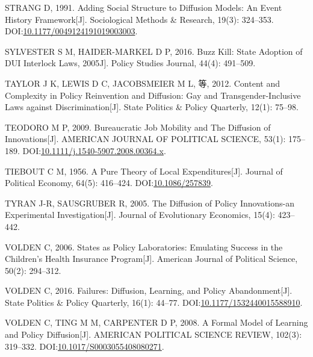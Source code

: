\documentclass[
  12pt,
]{ctexart}
\newlength{\cslhangindent}
\newlength{\cslentryspacingunit} %
\newenvironment{CSLReferences}[2] %
 {%
  \setlength{\parindent}{0pt}
  \ifodd #1
  \let\oldpar\par
  \def\par{\hangindent=\cslhangindent\oldpar}
  \fi
  \setlength{\parskip}{#2\cslentryspacingunit}
 }%
 {}
\begin{document}
\begin{CSLReferences}{1}{0}
\leavevmode{}%
STRANG D, 1991. Adding {Social Structure} to {Diffusion Models}: {An Event History Framework}{[}J{]}. Sociological Methods \& Research, 19(3): 324--353. DOI:\href{https://doi.org/10.1177/0049124191019003003}{10.1177/0049124191019003003}.

\leavevmode{}%
SYLVESTER S M, HAIDER-MARKEL D P, 2016. Buzz Kill: {State} Adoption of {DUI} Interlock Laws, 2005\textendash 11{[}J{]}. Policy Studies Journal, 44(4): 491--509.

\leavevmode{}%
TAYLOR J K, LEWIS D C, JACOBSMEIER M L, 等, 2012. Content and Complexity in Policy Reinvention and Diffusion: {Gay} and Transgender-Inclusive Laws against Discrimination{[}J{]}. State Politics \& Policy Quarterly, 12(1): 75--98.

\leavevmode{}%
TEODORO M P, 2009. Bureaucratic {Job Mobility} and {The Diffusion} of {Innovations}{[}J{]}. AMERICAN JOURNAL OF POLITICAL SCIENCE, 53(1): 175--189. DOI:\href{https://doi.org/10.1111/j.1540-5907.2008.00364.x}{10.1111/j.1540-5907.2008.00364.x}.

\leavevmode{}%
TIEBOUT C M, 1956. A {Pure Theory} of {Local Expenditures}{[}J{]}. Journal of Political Economy, 64(5): 416--424. DOI:\href{https://doi.org/10.1086/257839}{10.1086/257839}.

\leavevmode{}%
TYRAN J-R, SAUSGRUBER R, 2005. The Diffusion of Policy Innovations-an Experimental Investigation{[}J{]}. Journal of Evolutionary Economics, 15(4): 423--442.

\leavevmode{}%
VOLDEN C, 2006. States as {Policy Laboratories}: {Emulating Success} in the {Children}'s {Health Insurance Program}{[}J{]}. American Journal of Political Science, 50(2): 294--312.

\leavevmode{}%
VOLDEN C, 2016. Failures: {Diffusion}, {Learning}, and {Policy Abandonment}{[}J{]}. State Politics \& Policy Quarterly, 16(1): 44--77. DOI:\href{https://doi.org/10.1177/1532440015588910}{10.1177/1532440015588910}.

\leavevmode{}%
VOLDEN C, TING M M, CARPENTER D P, 2008. A Formal Model of Learning and Policy Diffusion{[}J{]}. AMERICAN POLITICAL SCIENCE REVIEW, 102(3): 319--332. DOI:\href{https://doi.org/10.1017/S0003055408080271}{10.1017/S0003055408080271}.


\end{CSLReferences}
\end{document}
